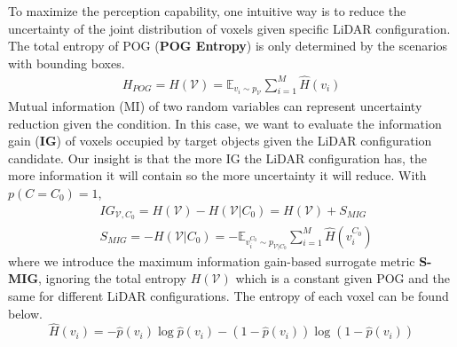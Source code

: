 \documentclass[10pt,twocolumn,letterpaper]{article}
\begin{document}
To maximize the perception capability, one intuitive way is to reduce the uncertainty of the joint distribution of voxels given specific LiDAR configuration. The total entropy of POG (\textbf{POG Entropy}) is only determined by the scenarios with bounding boxes.
\begin{align}
\label{totla_entropy}
H_{POG} = H(\mathcal{V}) =  \mathbb{E}_{v_i \sim p_{\mathcal{V}}} \sum_{i=1}^{M} \hat H(v_i)
\end{align}
Mutual information (MI) of two random variables can represent uncertainty reduction given the condition. In this case, we  want to evaluate the information gain (\textbf{IG}) of voxels occupied by target objects given the LiDAR configuration candidate. Our insight is that the more IG the LiDAR configuration has, the more information it will contain so the more uncertainty it will reduce. With  $p(C=C_0) = 1$,
\begin{align}
\label{IG}
&IG_{\mathcal{V}, C_0} =  H(\mathcal{V}) - H(\mathcal{V}|C_0) = H(\mathcal{V}) + S_{MIG} \\
\label{SurM_MIG}
&S_{MIG} = -H(\mathcal{V}|C_0) = -\mathbb{E}_{v_i^{C_0} \sim p_{\mathcal{V}| C_0}} \sum_{i=1}^{M} \hat H(v^{C_0}_i)
\end{align}
where we introduce the maximum information gain-based surrogate metric \textbf{S-MIG}, ignoring the total entropy $H(\mathcal{V})$ which is a constant given POG and the same for different LiDAR configurations. The entropy of each voxel can be found below.
$$\hat H(v_i) =  -\hat p(v_i)\log \hat p(v_i) - (1-\hat p(v_i))\log (1-\hat p(v_i)) $$

\end{document}
